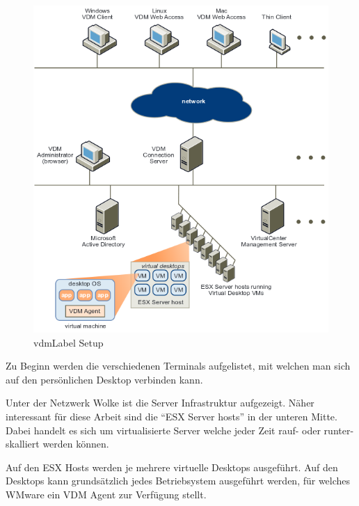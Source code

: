 \begin{figure}[H]
	\includegraphics[width=\textwidth]{images/vmware-vdm-setup}
	\caption{\Gls{vdmLabel} Setup}
	\label{fig:vdmSetup}
\end{figure}


Zu Beginn werden die verschiedenen Terminals aufgelistet, mit welchen man sich auf den persönlichen Desktop verbinden kann.

Unter der Netzwerk Wolke ist die Server Infrastruktur aufgezeigt.
Näher interessant für diese Arbeit sind die "`ESX Server hosts"' in der unteren Mitte. Dabei handelt es sich um virtualisierte Server welche jeder Zeit rauf- oder runter-skalliert werden können.

Auf den ESX Hosts werden je mehrere virtuelle Desktops ausgeführt.
Auf den Desktops kann grundsätzlich jedes Betriebsystem ausgeführt werden, für welches WMware ein VDM Agent zur Verfügung stellt.



